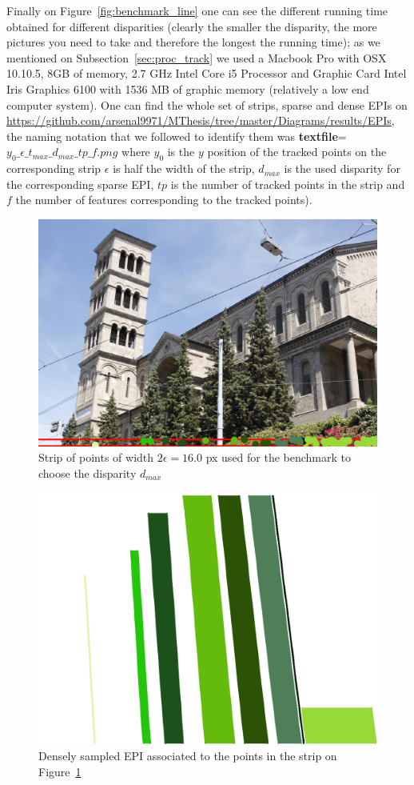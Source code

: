 \begin{itemize}
Finally on Figure~\ref{fig:benchmark_line} one can see the different running time obtained for different disparities (clearly the smaller the disparity, the more pictures you need to take and therefore the longest the running time); as we mentioned on Subsection~\ref{sec:proc_track} we used a Macbook Pro with OSX 10.10.5, 8GB of memory, 2.7 GHz Intel Core i5 Processor and Graphic Card Intel Iris Graphics 6100 with 1536 MB of graphic memory (relatively a low end computer system). One can find the whole set of strips, sparse and dense EPIs on \url{https://github.com/arsenal9971/MThesis/tree/master/Diagrams/results/EPIs}, the naming notation that we followed to identify them was \textbf{textfile}=$y_0\_\epsilon\_t_{max}\_d_{max}\_tp\_f.png$ where $y_0$ is the $y$ position of the tracked points on the corresponding strip $\epsilon$ is half the width of the strip, $d_{max}$ is the used disparity for the corresponding sparse EPI, $tp$ is the number of tracked points in the strip and $f$ the number of features corresponding to the tracked points).

\bigskip

\begin{figure}[h!]
\centering
\includegraphics[width = 0.7 \textwidth]{./Diagrams/results/Disparity_benchmark/673_10_102_4_48_8_strip.png}
\caption{Strip of points of width $2\epsilon = 16.0$ px used for the benchmark to choose the disparity $d_{max}$}
\label{fig:strip_disparity}
\end{figure}

\begin{figure}[h!]
\centering
\includegraphics[width = 0.7 \textwidth]{./Diagrams/results/Disparity_benchmark/673_10_102_4_48_8_dense.png}
\caption{Densely sampled EPI associated to the points in the strip on Figure~\ref{fig:strip_disparity}}
\label{fig:dense_disparity}
\end{figure}


\end{itemize}
